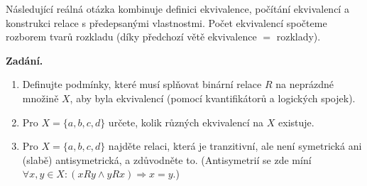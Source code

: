 \documentclass[11pt,a4paper]{article}
\begin{document}
\noindent Následující reálná otázka kombinuje definici ekvivalence, počítání ekvivalencí a konstrukci relace s předepsanými vlastnostmi. Počet ekvivalencí spočteme rozborem tvarů rozkladu (díky předchozí větě ekvivalence $=$ rozklady).

\begin{priklad} \par
\textbf{Zadání.}
\begin{enumerate}[label=(\arabic*)]
  \item Definujte podmínky, které musí splňovat binární relace $R$ na neprázdné množině $X$, aby byla ekvivalencí (pomocí kvantifikátorů a logických spojek).
  \item Pro $X=\{a,b,c,d\}$ určete, kolik různých ekvivalencí na $X$ existuje.
  \item Pro $X=\{a,b,c,d\}$ najděte relaci, která je tranzitivní, ale není symetrická ani (slabě) antisymetrická, a zdůvodněte to. (Antisymetrií se zde míní $\forall x,y\in X:(xRy\wedge yRx)\Rightarrow x=y$.)
\end{enumerate}


\end{priklad}
\end{document}
